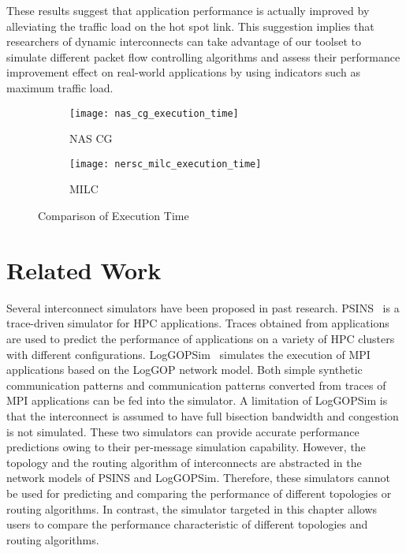 These results suggest that application performance is actually improved
by alleviating the traffic load on the hot spot link. This suggestion
implies that researchers of dynamic interconnects can take advantage of
our toolset to simulate different packet flow controlling algorithms and
assess their performance improvement effect on real-world applications
by using indicators such as maximum traffic load.

\begin{figure}
    \begin{subfigure}{.47\linewidth}
        \centering
        \texttt{[image: nas\_cg\_execution\_time]}
        \caption{NAS CG}%
        \label{fig:nas-cg-time}
    \end{subfigure}%
    \begin{subfigure}{.47\linewidth}
        \centering
        \texttt{[image: nersc\_milc\_execution\_time]}
        \caption{MILC}%
        \label{fig:nersc-milc-time}
    \end{subfigure}
    \caption{Comparison of Execution Time}%
    \label{fig:single-job-time}
\end{figure}

\section{Related Work}\label{sec:ii-related-work}

Several interconnect simulators have been proposed in past research.
PSINS~\autocite{Tikir2009} is a trace-driven simulator for HPC
applications. Traces obtained from applications are used to predict the
performance of applications on a variety of HPC clusters with different
configurations. LogGOPSim~\autocite{Hoefler2010} simulates the execution
of MPI applications based on the LogGOP network model. Both simple
synthetic communication patterns and communication patterns converted
from traces of MPI applications can be fed into the simulator. A
limitation of LogGOPSim is that the interconnect is assumed to have full
bisection bandwidth and congestion is not simulated. These two
simulators can provide accurate performance predictions owing to their
per-message simulation capability. However, the topology and the routing
algorithm of interconnects are abstracted in the network models of PSINS
and LogGOPSim. Therefore, these simulators cannot be used for predicting
and comparing the performance of different topologies or routing
algorithms. In contrast, the simulator targeted in this chapter allows
users to compare the performance characteristic of different topologies
and routing algorithms.

